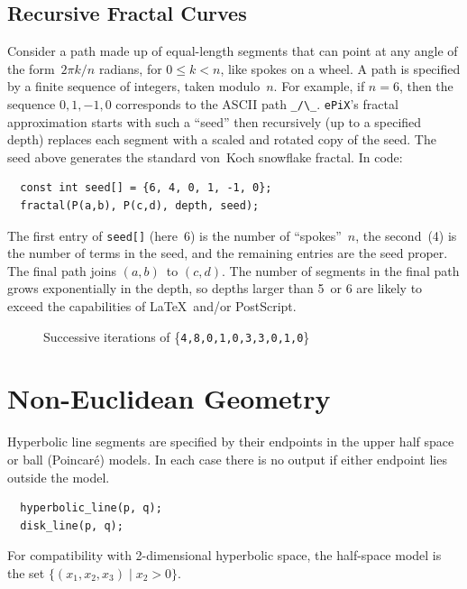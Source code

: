 \documentclass[12pt]{report}
\newcommand{\code}[1]{\texttt{#1}}
\newcommand{\ePiX}{\code{ePiX}}
\begin{document}
\subsection*{Recursive Fractal Curves}  

Consider a path made up of equal-length segments that can point at any
angle of the form~$2\pi k/n$ radians, for $0\leq k<n$, like spokes on
a wheel. A path is specified by a finite sequence of integers, taken
modulo~$n$. For example, if $n=6$, then the sequence $0, 1, -1, 0$
corresponds to the ASCII path \verb+_/\_+.  \ePiX's fractal
approximation starts with such a ``seed'' then recursively (up to a
specified depth) replaces each segment with a scaled and rotated copy
of the seed. The seed above generates the standard von~Koch snowflake
fractal. In code:
\begin{verbatim}
  const int seed[] = {6, 4, 0, 1, -1, 0};
  fractal(P(a,b), P(c,d), depth, seed);
\end{verbatim}
The first entry of \code{seed[]} (here~6) is the number of
``spokes''~$n$, the second~(4) is the number of terms in the seed, and
the remaining entries are the seed proper. The final path joins
$(a,b)$~to $(c,d)$. The number of segments in the final path grows
exponentially in the depth, so depths larger than 5~or 6 are
likely to exceed the capabilities of \LaTeX\ and/or PostScript.
\begin{figure}[hbt]
  \begin{center}
  
  \end{center}
  \caption{Successive iterations of \{\code{4,8,0,1,0,3,3,0,1,0}\}}
\end{figure}


\section{Non-Euclidean Geometry}
\label{section:non-eucl}

Hyperbolic line segments are specified by their endpoints in the upper
half space or ball (Poincar\'e) models.  In each case there is no
output if either endpoint lies outside the model.
\begin{verbatim}
  hyperbolic_line(p, q);
  disk_line(p, q);
\end{verbatim}
For compatibility with 2-dimensional hyperbolic space, the half-space
model is the set $\{(x_1,x_2,x_3)\mid x_2>0\}$.
\end{document}
